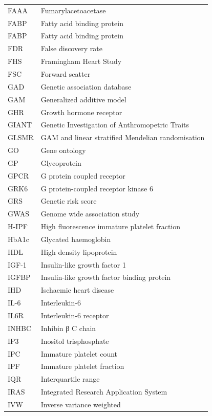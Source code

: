 \documentclass[11pt,twoside]{bristolthesis}
\begin{document}
\begin{abbreviations}
\begin{longtable}[t]{ll}
    FAAA & Fumarylacetoacetase\\
    FABP & Fatty acid binding protein\\
    \addlinespace
    FABP & Fatty acid binding protein\\
    FDR & False discovery rate\\
    FHS & Framingham Heart Study\\
    FSC & Forward scatter\\
    GAD & Genetic association database\\
    \addlinespace
    GAM & Generalized additive model\\
    GHR & Growth hormone receptor\\
    GIANT & Genetic Investigation of Anthromopetric Traits\\
    GLSMR & GAM and linear stratified Mendelian randomisation\\
    GO & Gene ontology\\
    \addlinespace
    GP & Glycoprotein\\
    GPCR & G protein coupled receptor\\
    GRK6 & G protein-coupled receptor kinase 6\\
    GRS & Genetic risk score\\
    GWAS & Genome wide association study\\
    \addlinespace
    H-IPF & High fluorescence immature platelet fraction\\
    HbA1c & Glycated haemoglobin\\
    HDL & High density lipoprotein\\
    IGF-1 & Insulin-like growth factor 1\\
    IGFBP & Insulin-like growth factor binding protein\\
    \addlinespace
    IHD & Ischaemic heart disease\\
    IL-6 & Interleukin-6\\
    IL6R & Interleukin-6 receptor\\
    INHBC & Inhibin β C chain\\
    IP3 & Inositol trisphosphate\\
    \addlinespace
    IPC & Immature platelet count\\
    IPF & Immature platelet fraction\\
    IQR & Interquartile range\\
    IRAS & Integrated Research Application System\\
    IVW & Inverse variance weighted\\

\end{longtable}
\end{abbreviations}
\end{document}
